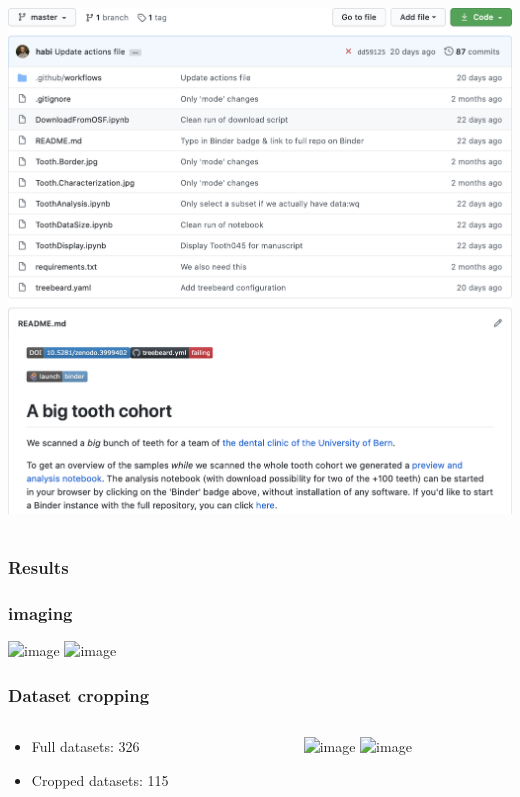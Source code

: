 \begin{frame}
\begin{columns}
\begin{column}{0.5\linewidth}
{ 				\href{https://mybinder.org/v2/gh/habi/zmk-tooth-cohort/master?filepath=ToothAnalysis.ipynb}{\includegraphics[height=\imageheight]{./images/zmk/binder}}%
 				}%
 		\end{column}
 	\end{columns}
 \end{frame}

 \subsubsection{Results}
 \renewcommand{\imageheight}{0.618\paperheight}
 \begin{frame}
 	\frametitle{\uct imaging}
 	\centering
 	\includegraphics<1|handout:0>[height=\imageheight]{./images/zmk/ScanOverviews.104.png}%
 	\includegraphics<2>[height=\imageheight]{./images/zmk/ScanOverviews.24.png}%
 \end{frame}

 \renewcommand{\imagewidth}{\linewidth}
 \begin{frame}
 	\frametitle{Dataset cropping}
 	\begin{columns}
 		\begin{column}{0.382\linewidth}
 			\begin{itemize}
 				\item Full datasets: \qty{326}{\giga\byte}%
 				\item<2> Cropped datasets: \qty{115}{\giga\byte}%
 			\end{itemize}
 		\end{column}
 		\begin{column}{0.618\linewidth}
 			\centering%
 			\includegraphics<1|handout:1>[width=\imagewidth]{./images/zmk/tooth045/Tooth045.Cropper.Original.png}%
 			\includegraphics<2|handout:2>[width=\imagewidth]{./images/zmk/tooth045/Tooth045.Cropper.Cropped.png}%
 		\end{column}
 	\end{columns}
 \end{frame}


